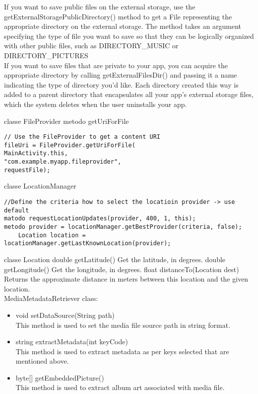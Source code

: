 \documentclass[letterpaper,twocolumn,10pt]{article}
\begin{document}
If you want to save public files on the external storage, use the getExternalStoragePublicDirectory() method to get a File representing the appropriate directory on the external storage. The method takes an argument specifying the type of file you want to save so that they can be logically organized with other public files, such as DIRECTORY\_MUSIC or DIRECTORY\_PICTURES \\

If you want to save files that are private to your app, you can acquire the appropriate directory by calling getExternalFilesDir() and passing it a name indicating the type of directory you'd like. Each directory created this way is added to a parent directory that encapsulates all your app's external storage files, which the system deletes when the user uninstalls your app.

classe FileProvider
metodo getUriForFile
\begin{verbatim}
// Use the FileProvider to get a content URI
fileUri = FileProvider.getUriForFile(
MainActivity.this,
"com.example.myapp.fileprovider",
requestFile);
\end{verbatim}

classe LocationManager
\begin{verbatim}
//Define the criteria how to select the locatioin provider -> use default
matodo requestLocationUpdates(provider, 400, 1, this);
metodo provider = locationManager.getBestProvider(criteria, false);
    Location location = locationManager.getLastKnownLocation(provider);
\end{verbatim} 

classe Location
double	 getLatitude()
Get the latitude, in degrees.
double	 getLongitude()
Get the longitude, in degrees.
float	 distanceTo(Location dest)
Returns the approximate distance in meters between this location and the given location.\\

MediaMetadataRetriever class:
\begin{itemize}
\item void setDataSource(String path)\\This method is used to set the media file source path in string format.
\item string extractMetadata(int keyCode)\\This method is used to extract metadata as per keys selected that are mentioned above. 
\item byte[] getEmbeddedPicture()\\This method is used to extract album art associated with media file.
\end{itemize}
\end{document}
